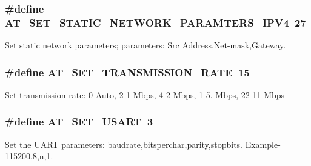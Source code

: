 \subsubsection[{\texorpdfstring{A\+T\+\_\+\+S\+E\+T\+\_\+\+S\+T\+A\+T\+I\+C\+\_\+\+N\+E\+T\+W\+O\+R\+K\+\_\+\+P\+A\+R\+A\+M\+T\+E\+R\+S\+\_\+\+I\+P\+V4}{AT_SET_STATIC_NETWORK_PARAMTERS_IPV4}}]{\setlength{\rightskip}{0pt plus 5cm}\#define A\+T\+\_\+\+S\+E\+T\+\_\+\+S\+T\+A\+T\+I\+C\+\_\+\+N\+E\+T\+W\+O\+R\+K\+\_\+\+P\+A\+R\+A\+M\+T\+E\+R\+S\+\_\+\+I\+P\+V4~27}\hypertarget{group__wireless__interface_gafb0de0f1941fdbabc80fe8107f181e71}{}\label{group__wireless__interface_gafb0de0f1941fdbabc80fe8107f181e71}
Set static network parameters; parameters\+: Src Address,Net-\/mask,Gateway. 
\subsubsection[{\texorpdfstring{A\+T\+\_\+\+S\+E\+T\+\_\+\+T\+R\+A\+N\+S\+M\+I\+S\+S\+I\+O\+N\+\_\+\+R\+A\+TE}{AT_SET_TRANSMISSION_RATE}}]{\setlength{\rightskip}{0pt plus 5cm}\#define A\+T\+\_\+\+S\+E\+T\+\_\+\+T\+R\+A\+N\+S\+M\+I\+S\+S\+I\+O\+N\+\_\+\+R\+A\+TE~15}\hypertarget{group__wireless__interface_gaa47446fe17b0f63ff45b40c5a4c6ba1f}{}\label{group__wireless__interface_gaa47446fe17b0f63ff45b40c5a4c6ba1f}
Set transmission rate\+: 0-\/\+Auto, 2-\/1 Mbps, 4-\/2 Mbps, 1-\/5. Mbps, 22-\/11 Mbps 
\subsubsection[{\texorpdfstring{A\+T\+\_\+\+S\+E\+T\+\_\+\+U\+S\+A\+RT}{AT_SET_USART}}]{\setlength{\rightskip}{0pt plus 5cm}\#define A\+T\+\_\+\+S\+E\+T\+\_\+\+U\+S\+A\+RT~3}\hypertarget{group__wireless__interface_ga211cc8f008c479740ebdbdc6ed3268d8}{}\label{group__wireless__interface_ga211cc8f008c479740ebdbdc6ed3268d8}
Set the U\+A\+RT parameters\+: baudrate,bitsperchar,parity,stopbits. Example-\/115200,8,n,1. 
